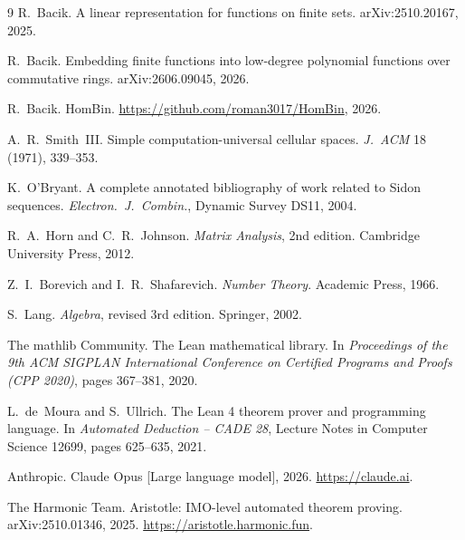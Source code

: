 \documentclass[11pt]{article}
\theoremstyle{definition}
\begin{document}
\begin{thebibliography}{9}
R.~Bacik.
\newblock A linear representation for functions on finite sets.
\newblock arXiv:2510.20167, 2025.

R.~Bacik.
\newblock Embedding finite functions into low-degree polynomial functions over commutative
rings.
\newblock arXiv:2606.09045, 2026.

R.~Bacik.
\newblock HomBin.
\newblock \url{https://github.com/roman3017/HomBin}, 2026.

A.~R.~Smith~III.
\newblock Simple computation-universal cellular spaces.
\newblock \emph{J.\ ACM} 18 (1971), 339--353.

K.~O'Bryant.
\newblock A complete annotated bibliography of work related to Sidon sequences.
\newblock \emph{Electron.\ J.\ Combin.}, Dynamic Survey DS11, 2004.

R.~A.~Horn and C.~R.~Johnson.
\newblock \emph{Matrix Analysis}, 2nd edition.
\newblock Cambridge University Press, 2012.

Z.~I.~Borevich and I.~R.~Shafarevich.
\newblock \emph{Number Theory}.
\newblock Academic Press, 1966.

S.~Lang.
\newblock \emph{Algebra}, revised 3rd edition.
\newblock Springer, 2002.

The mathlib Community.
\newblock The Lean mathematical library.
\newblock In \emph{Proceedings of the 9th ACM SIGPLAN International Conference on Certified
Programs and Proofs (CPP 2020)}, pages 367--381, 2020.

L.~de~Moura and S.~Ullrich.
\newblock The Lean 4 theorem prover and programming language.
\newblock In \emph{Automated Deduction -- CADE 28}, Lecture Notes in Computer Science 12699,
pages 625--635, 2021.

Anthropic.
\newblock Claude Opus [Large language model], 2026.
\newblock \url{https://claude.ai}.

The Harmonic Team.
\newblock Aristotle: IMO-level automated theorem proving.
\newblock arXiv:2510.01346, 2025. \url{https://aristotle.harmonic.fun}.
\end{thebibliography}
\end{document}
